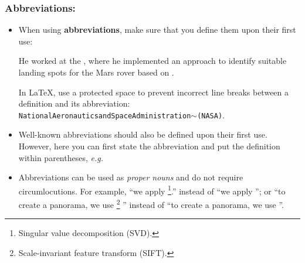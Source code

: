 \documentclass[11pt,a4paper]{article}
\begin{document}
\subsubsection*{Abbreviations:}
\begin{itemize}
  \item When using \textbf{abbreviations}, make sure that you define them upon 
their first use:
  \vspace{-1.5em}
  \begin{goodexample}
    He worked at the , where he implemented an approach to identify suitable landing spots for the Mars rover based on .

    In \LaTeX, use a protected space to prevent incorrect line breaks between a definition and its abbreviation: \\\texttt{National{\textvisiblespace}Aeronautics{\textvisiblespace}and{\textvisiblespace}Space{\textvisiblespace}Administration$\sim$(NASA)}.
  \end{goodexample}
  
  \item Well-known abbreviations should also be defined upon their first use. However, here you can first state the abbreviation and put the definition within parentheses, \emph{e.g.} 
%     
  
  \item Abbreviations can be used as \emph{proper nouns} and do not require circumlocutions.
  For example, ``we apply \footnote{Singular value decomposition (SVD).}.'' instead of ``we apply ''; or ``to create a panorama, we use \footnote{Scale-invariant feature transform (SIFT).} '' instead of ``to create a panorama, we use ''.

\end{itemize}
\end{document}
